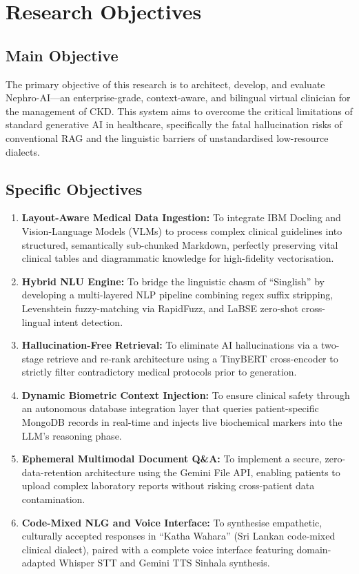 \documentclass[12pt,a4paper]{report}
\begin{document}
\section{Research Objectives}
\label{sec:objectives}

\subsection{Main Objective}

The primary objective of this research is to architect, develop, and evaluate Nephro-AI---an enterprise-grade, context-aware, and bilingual virtual clinician for the management of CKD. This system aims to overcome the critical limitations of standard generative AI in healthcare, specifically the fatal hallucination risks of conventional RAG and the linguistic barriers of unstandardised low-resource dialects.

\subsection{Specific Objectives}

\begin{enumerate}
  \item \textbf{Layout-Aware Medical Data Ingestion:} To integrate IBM Docling and Vision-Language Models (VLMs) to process complex clinical guidelines into structured, semantically sub-chunked Markdown, perfectly preserving vital clinical tables and diagrammatic knowledge for high-fidelity vectorisation.

  \item \textbf{Hybrid NLU Engine:} To bridge the linguistic chasm of ``Singlish'' by developing a multi-layered NLP pipeline combining regex suffix stripping, Levenshtein fuzzy-matching via RapidFuzz, and LaBSE zero-shot cross-lingual intent detection.

  \item \textbf{Hallucination-Free Retrieval:} To eliminate AI hallucinations via a two-stage retrieve and re-rank architecture using a TinyBERT cross-encoder to strictly filter contradictory medical protocols prior to generation.

  \item \textbf{Dynamic Biometric Context Injection:} To ensure clinical safety through an autonomous database integration layer that queries patient-specific MongoDB records in real-time and injects live biochemical markers into the LLM's reasoning phase.

  \item \textbf{Ephemeral Multimodal Document Q\&A:} To implement a secure, zero-data-retention architecture using the Gemini File API, enabling patients to upload complex laboratory reports without risking cross-patient data contamination.

  \item \textbf{Code-Mixed NLG and Voice Interface:} To synthesise empathetic, culturally accepted responses in ``Katha Wahara'' (Sri Lankan code-mixed clinical dialect), paired with a complete voice interface featuring domain-adapted Whisper STT and Gemini TTS Sinhala synthesis.
\end{enumerate}
\end{document}
